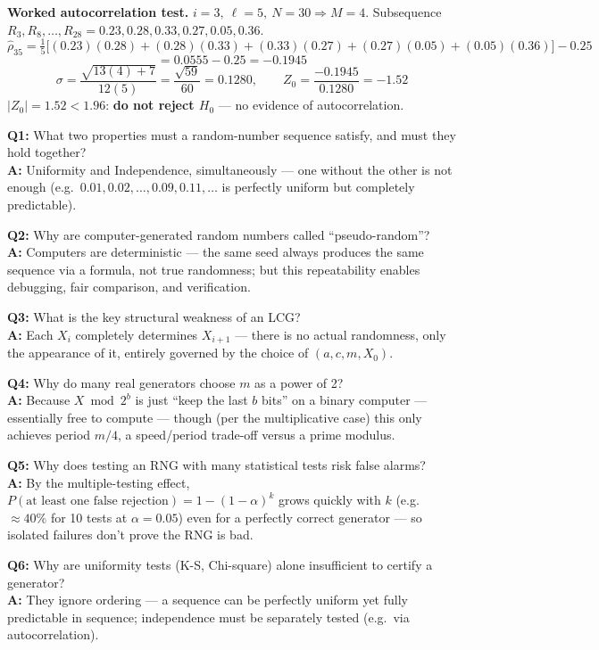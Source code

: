 \begin{examplebox}
\textbf{Worked autocorrelation test.} $i=3,\ \ell=5,\ N=30\Rightarrow M=4$. Subsequence $R_3,R_8,\dots,R_{28} = 0.23,0.28,0.33,0.27,0.05,0.36$.
\[
\hat\rho_{35} = \tfrac15\big[(0.23)(0.28)+(0.28)(0.33)+(0.33)(0.27)+(0.27)(0.05)+(0.05)(0.36)\big]-0.25
\]
\[
= 0.0555-0.25=-0.1945
\]
\[
\sigma = \frac{\sqrt{13(4)+7}}{12(5)}=\frac{\sqrt{59}}{60}=0.1280, \qquad Z_0=\frac{-0.1945}{0.1280}=-1.52
\]
$|Z_0|=1.52<1.96$: \textbf{do not reject $H_0$} — no evidence of autocorrelation.
\end{examplebox}

\begin{qabox}
\textbf{Q1:} What two properties must a random-number sequence satisfy, and must they hold together? \\
\textbf{A:} Uniformity and Independence, simultaneously — one without the other is not enough (e.g.\ $0.01,0.02,\dots,0.09,0.11,\dots$ is perfectly uniform but completely predictable).

\textbf{Q2:} Why are computer-generated random numbers called ``pseudo-random''? \\
\textbf{A:} Computers are deterministic — the same seed always produces the same sequence via a formula, not true randomness; but this repeatability enables debugging, fair comparison, and verification.

\textbf{Q3:} What is the key structural weakness of an LCG? \\
\textbf{A:} Each $X_i$ completely determines $X_{i+1}$ — there is no actual randomness, only the appearance of it, entirely governed by the choice of $(a,c,m,X_0)$.

\textbf{Q4:} Why do many real generators choose $m$ as a power of 2? \\
\textbf{A:} Because $X\bmod 2^b$ is just ``keep the last $b$ bits'' on a binary computer — essentially free to compute — though (per the multiplicative case) this only achieves period $m/4$, a speed/period trade-off versus a prime modulus.

\textbf{Q5:} Why does testing an RNG with many statistical tests risk false alarms? \\
\textbf{A:} By the multiple-testing effect, $P(\text{at least one false rejection})=1-(1-\alpha)^k$ grows quickly with $k$ (e.g.\ $\approx40\%$ for 10 tests at $\alpha=0.05$) even for a perfectly correct generator — so isolated failures don't prove the RNG is bad.

\textbf{Q6:} Why are uniformity tests (K-S, Chi-square) alone insufficient to certify a generator? \\
\textbf{A:} They ignore ordering — a sequence can be perfectly uniform yet fully predictable in sequence; independence must be separately tested (e.g.\ via autocorrelation).


\end{qabox}
